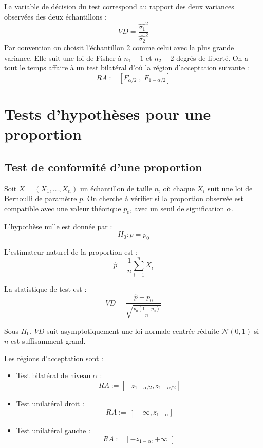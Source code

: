 La variable de décision du test correspond au rapport des deux variances observées des deux échantillons :
    \[ VD = \frac{\hat{\sigma_1}^2}{\hat{\sigma_2}^2} \] 
Par convention on choisit l'échantillon 2 comme celui avec la plus grande variance. 
Elle suit une loi de Fisher à $n_1 -1$ et $n_2 - 2$ degrés de liberté. 
On a tout le temps affaire à un test bilatéral d'où la région d'acceptation suivante :
        \[ RA := [F_{\alpha/2}\; , \; F_{1 - \alpha/2} ] \] 
   

\section{Tests d'hypothèses pour une proportion}

\subsection{Test de conformité d'une proportion}

Soit $X = (X_1, \dots, X_n)$ un échantillon de taille $n$, où chaque $X_i$ suit une loi de Bernoulli de paramètre $p$.
On cherche à vérifier si la proportion observée est compatible avec une valeur théorique $p_0$, 
avec un seuil de signification $\alpha$.

L'hypothèse nulle est donnée par :
\[
H_0 : p = p_0
\]

L'estimateur naturel de la proportion est :
\[
\hat{p} = \frac{1}{n} \sum_{i=1}^{n} X_i
\]

La statistique de test est :
\[
VD = \frac{\hat{p} - p_0}{\sqrt{\frac{p_0 (1 - p_0)}{n}}}
\]

Sous $H_0$, $VD$ suit asymptotiquement une loi normale centrée réduite 
$\mathcal{N}(0,1)$ si $n$ est suffisamment grand.

Les régions d'acceptation sont :
\begin{itemize}
    \item Test bilatéral de niveau $\alpha$ :
        \[
        RA := \left[ -z_{1-\alpha/2}, z_{1-\alpha/2} \right]
        \]
    \item Test unilatéral droit :
        \[
        RA := \left] -\infty, z_{1-\alpha} \right]
        \]
    \item Test unilatéral gauche :
        \[
        RA := \left[ -z_{1-\alpha}, +\infty \right[
        \]
\end{itemize}

